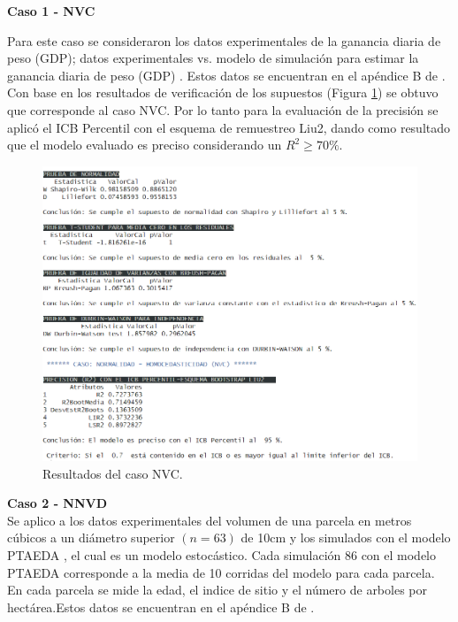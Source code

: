 \textbf{Caso 1 - NVC}

Para este caso se consideraron los datos experimentales de la ganancia diaria de peso (GDP); datos experimentales vs. modelo de simulación para estimar la ganancia diaria de peso (GDP) \parencite{osorio-2011}. Estos datos se encuentran en el apéndice B de \textcite{balam-2012}.\\


Con base en los resultados de verificación de los supuestos (Figura \ref{fig:final_NVC_resultados}) se obtuvo que corresponde al caso NVC. Por lo tanto para la evaluación de la precisión se aplicó el ICB Percentil con el esquema de remuestreo Liu2, dando como resultado que el modelo evaluado es preciso considerando un $R^2 \geq 70\%$.


\begin{figure}[ht!]
	\centering 
	\includegraphics[width=0.85\linewidth]{img/Uso_NVC_PropuestaFinal.png} 
	\caption{Resultados del caso NVC.}
	\label{fig:final_NVC_resultados}
\end{figure}
\FloatBarrier







\textbf{Caso 2 - NNVD}\\

Se aplico a los datos experimentales del volumen de una parcela en metros cúbicos a un diámetro superior $(n = 63)$ de 10cm y los simulados con el modelo PTAEDA \parencite{chung-1987}, el cual es un modelo estocástico. Cada simulación 86 con el modelo PTAEDA corresponde a la media de 10 corridas del modelo para cada parcela. En cada parcela se mide la edad, el indice de sitio y el número de arboles por hectárea.Estos datos se encuentran en el apéndice B de \textcite{balam-2012}.\\


